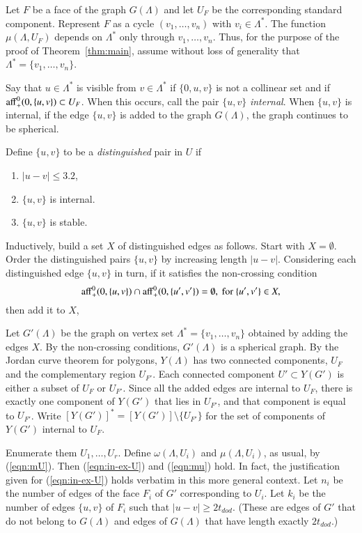 \documentclass{article} %
\begin{document}
Let $F$ be a face of the graph $G(\Lambda)$ and let $U_F$ be the
corresponding standard component.  Represent $F$ as a cycle
$(v_1,\ldots,v_n)$ with $v_i\in\Lambda^*$.  The function
$\mu(\Lambda,U_F)$ depends  on $\Lambda^*$ only through
$v_1,\ldots,v_n$.  Thus, for the purpose of the proof of
Theorem~\ref{thm:main},  assume without loss of generality
that $\Lambda^* = \{v_1,\ldots,v_n\}$.

Say that $u\in\Lambda^*$ is visible from $v\in\Lambda^*$ if
$\{0,u,v\}$ is not a collinear set and if
${\operatorname{aff}}_+^0(0,\{u,v\})\subset U_F$.  When this occurs, 
call the pair $\{u,v\}$ {\it internal}.  When $\{u,v\}$
is  internal, if the edge $\{u,v\}$ is added to the
graph $G(\Lambda)$, the graph continues to be spherical.

Define $\{u,v\}$ to be a {\it distinguished} pair in $U$ if
\begin{enumerate}
\item  $|u-v|\le3.2$, 
\item $\{u,v\}$ is internal.
\item  $\{u,v\}$ is stable.
\end{enumerate}  

Inductively, build a set $X$ of distinguished edges as follows.
Start with $X=\emptyset$.
Order the distinguished pairs $\{u,v\}$ by increasing
length $|u-v|$.  Considering each
distinguished edge $\{u,v\}$ in turn,
if it satisfies
the non-crossing condition
  $$
  {\operatorname{aff}}_+^0(0,\{u,v\}) \cap {\operatorname{aff}}_+^0(0,\{u',v'\}) = \emptyset,
  \text{ for } \{u',v'\}\in X,
$$
then add it to $X$, 



Let $G'(\Lambda)$ be the graph on vertex set $\Lambda^*=\{v_1,\ldots,v_n\}$ obtained by adding the edges $X$.  By the non-crossing
conditions, $G'(\Lambda)$ is a spherical graph.  
By the Jordan curve theorem for polygons, $Y(\Lambda)$ has two connected 
components,
$U_F$ and the complementary region $U_{F'}$.
Each
connected component $U'\subset Y(G')$ is either a subset of $U_F$ or $U_{F'}$.
Since all the added edges are internal to $U_F$, there is exactly
one component of $Y(G')$ that lies in $U_{F'}$, and that component
is equal to $U_{F'}$.  Write $[Y(G')]^* = [Y(G')]\setminus\{U_{F'}\}$
for the set of components of $Y(G')$ internal to $U_F$.

Enumerate them $U_1,\ldots,U_r$.  Define $\omega(\Lambda,U_i)$ and
$\mu(\Lambda,U_i)$, as usual,  by (\ref{eqn:mU}).  Then
(\ref{eqn:in-ex-U}) and (\ref{eqn:mu}) hold.  In fact, the justification
given for (\ref{eqn:in-ex-U}) holds verbatim in this more general
context. Let $n_i$ be the number of edges of the face
$F_i$ of $G'$ corresponding to $U_i$.  Let $k_i$ be the number of edges
$\{u,v\}$
of $F_i$ such that $|u-v|\ge 2t_{dod}$. (These are edges of $G'$ that do not
belong to $G(\Lambda)$ and edges of $G(\Lambda)$ that have
length exactly $2t_{dod}$.)  
\end{document}
